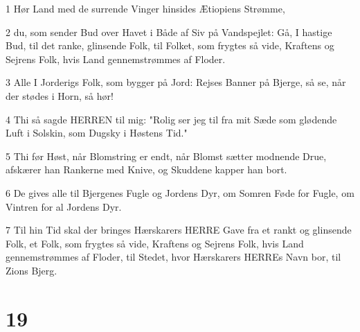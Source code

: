\par 1 Hør Land med de surrende Vinger hinsides Ætiopiens Strømme,
\par 2 du, som sender Bud over Havet i Både af Siv på Vandspejlet: Gå, I hastige Bud, til det ranke, glinsende Folk, til Folket, som frygtes så vide, Kraftens og Sejrens Folk, hvis Land gennemstrømmes af Floder.
\par 3 Alle I Jorderigs Folk, som bygger på Jord: Rejses Banner på Bjerge, så se, når der stødes i Horn, så hør!
\par 4 Thi så sagde HERREN til mig: "Rolig ser jeg til fra mit Sæde som glødende Luft i Solskin, som Dugsky i Høstens Tid."
\par 5 Thi før Høst, når Blomstring er endt, når Blomst sætter modnende Drue, afskærer han Rankerne med Knive, og Skuddene kapper han bort.
\par 6 De gives alle til Bjergenes Fugle og Jordens Dyr, om Somren Føde for Fugle, om Vintren for al Jordens Dyr.
\par 7 Til hin Tid skal der bringes Hærskarers HERRE Gave fra et rankt og glinsende Folk, et Folk, som frygtes så vide, Kraftens og Sejrens Folk, hvis Land gennemstrømmes af Floder, til Stedet, hvor Hærskarers HERREs Navn bor, til Zions Bjerg.

\chapter{19}

